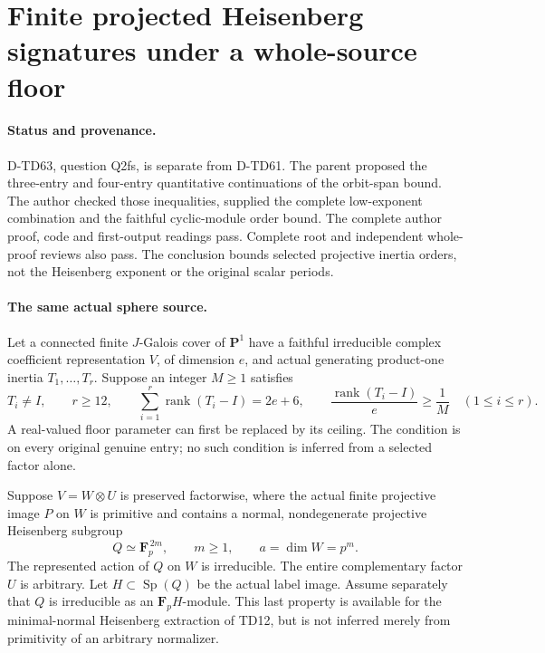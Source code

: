 \section{Finite projected Heisenberg signatures under a whole-source floor}
\label{sec:heisenberg-finite-signature}

\paragraph{Status and provenance.}
D-TD63, question Q2fs, is separate from D-TD61.
The parent proposed the three-entry and four-entry quantitative
continuations of the orbit-span bound.
The author checked those inequalities, supplied the complete
low-exponent combination and the faithful cyclic-module order bound.
The complete author proof, code and first-output readings pass.
Complete root and independent whole-proof reviews also pass.
The conclusion bounds selected projective inertia orders, not the
Heisenberg exponent or the original scalar periods.

\paragraph{The same actual sphere source.}
Let a connected finite \(J\)-Galois cover of \(\mathbf P^1\) have a
faithful irreducible complex coefficient representation \(V\), of
dimension \(e\), and actual generating product-one inertia
\(T_1,\ldots,T_r\).  Suppose an integer \(M\ge1\) satisfies
\[
 T_i\ne I,\qquad r\ge12,\qquad
 \sum_{i=1}^r\operatorname{rank}(T_i-I)=2e+6,\qquad
 \frac{\operatorname{rank}(T_i-I)}e\ge\frac1M
       \quad(1\le i\le r).
 \tag{HFS.1}
\]
A real-valued floor parameter can first be replaced by its ceiling.
The condition is on every original genuine entry; no such condition
is inferred from a selected factor alone.

Suppose \(V=W\otimes U\) is preserved factorwise, where the actual
finite projective image \(P\) on \(W\) is primitive and contains a
normal, nondegenerate projective Heisenberg subgroup
\[
 Q\simeq\mathbf F_p^{\,2m},\qquad m\ge1,\qquad
                 a=\dim W=p^m.
 \tag{HFS.2}
\]
The represented action of \(Q\) on \(W\) is irreducible.
The entire complementary factor \(U\) is arbitrary.
Let \(H\subset\operatorname{Sp}(Q)\) be the actual label image.
Assume separately that \(Q\) is irreducible as an
\(\mathbf F_pH\)-module.  This last property is available for the
minimal-normal Heisenberg extraction of TD12, but is not inferred
merely from primitivity of an arbitrary normalizer.

